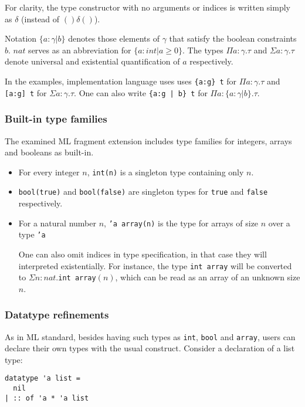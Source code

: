\documentclass[a4paper,UKenglish]{lipics-v2016}
\begin{document}
For clarity, the type constructor with no arguments or indices is written
simply as $\delta$ (instead of $()\delta()$).

Notation $\{ a: \gamma | b \}$ denotes those elements of $\gamma$ that satisfy
the boolean constraints $b$.  $nat$ serves as an abbreviation for $\{ a: int |
a \geq 0 \}$. The types $\Pi a: \gamma. \tau$ and $\Sigma a: \gamma. \tau$
denote universal and existential quantification of $a$ respectively.

In the examples, implementation language uses uses \texttt{\{a:g\} t} for $\Pi
a: \gamma. \tau$ and \texttt{[a:g] t} for $\Sigma a: \gamma. \tau$. One can
also write \texttt{\{a:g | b\} t} for $\Pi a: \{a: \gamma | b\}. \tau$.

\subsubsection{Built-in type families}

The examined ML fragment extension includes type families for integers, arrays
and booleans as built-in.

\begin{itemize}
  \item For every integer $n$, \texttt{int(n)} is a singleton type containing
    only $n$.
  \item \texttt{bool(true)} and \texttt{bool(false)} are singleton types for
    \texttt{true} and \texttt{false} respectively.
  \item For a natural number $n$, \texttt{'a array(n)} is the type for arrays
    of size $n$ over a type \texttt{'a}

    One can also omit indices in type specification, in that case they will
    interpreted existentially. For instance, the type \texttt{int array} will
    be converted to $\Sigma n : nat$.\texttt{int array}$(n)$, which can be read
    as an array of an unknown size $n$.
\end{itemize}

\subsubsection{Datatype refinements}

As in ML standard, besides having such types as \texttt{int}, \texttt{bool} and
\texttt{array}, users can declare their own types with the usual construct.
Consider a declaration of a list type:
\begin{verbatim}
datatype 'a list =
  nil
| :: of 'a * 'a list
\end{verbatim}
\end{document}
